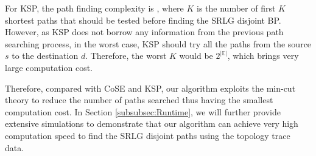 For KSP\cite{eppstein1998finding}, the path finding complexity is , where $K$ is the number of first $K$ shortest paths that should be tested before finding the SRLG disjoint BP. However, as KSP does not borrow any information from the previous path searching process, in the worst case, KSP should try all the paths from the source $s$ to the destination $d$. Therefore, the worst $K$ would be  $2^{|\mathbb{E}|}$, which brings very large computation cost.

Therefore, compared with  CoSE\cite{rostami2007cose} and KSP\cite{eppstein1998finding}, our algorithm exploits the min-cut theory to reduce the number of paths searched thus having the smallest computation cost.  In Section \ref{subsubsec:Runtime}, we will further provide extensive simulations to demonstrate that our algorithm can achieve very high computation speed to find the SRLG disjoint paths using the topology trace data.
